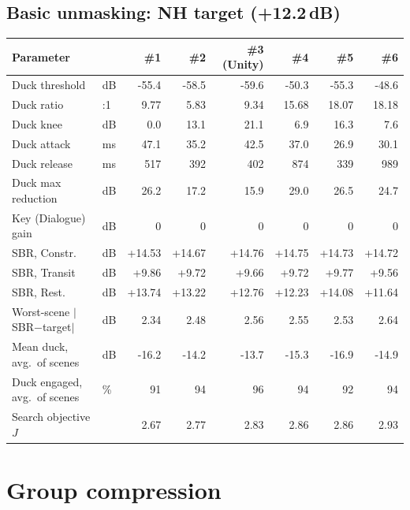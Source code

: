\documentclass[11pt]{article}
\begin{document}
\subsection*{Basic unmasking: NH target (+12.2\,dB)}
\begin{table}[H]\centering\scriptsize
\begin{tabular}{@{}l l rrrrrr@{}}
\toprule
\textbf{Parameter} & & \textbf{\#1} & \textbf{\#2} & \textbf{\#3} \textbf{(Unity)} & \textbf{\#4} & \textbf{\#5} & \textbf{\#6} \\
\midrule
Duck threshold & dB & -55.4 & -58.5 & -59.6 & -50.3 & -55.3 & -48.6 \\
Duck ratio & :1 & 9.77 & 5.83 & 9.34 & 15.68 & 18.07 & 18.18 \\
Duck knee & dB & 0.0 & 13.1 & 21.1 & 6.9 & 16.3 & 7.6 \\
Duck attack & ms & 47.1 & 35.2 & 42.5 & 37.0 & 26.9 & 30.1 \\
Duck release & ms & 517 & 392 & 402 & 874 & 339 & 989 \\
Duck max reduction & dB & 26.2 & 17.2 & 15.9 & 29.0 & 26.5 & 24.7 \\
Key (Dialogue) gain & dB & 0 & 0 & 0 & 0 & 0 & 0 \\
\midrule
SBR, Constr. & dB & +14.53 & +14.67 & +14.76 & +14.75 & +14.73 & +14.72 \\
SBR, Transit & dB & +9.86 & +9.72 & +9.66 & +9.72 & +9.77 & +9.56 \\
SBR, Rest. & dB & +13.74 & +13.22 & +12.76 & +12.23 & +14.08 & +11.64 \\
Worst-scene $|$SBR$-$target$|$ & dB & 2.34 & 2.48 & 2.56 & 2.55 & 2.53 & 2.64 \\
Mean duck, avg.\ of scenes & dB & -16.2 & -14.2 & -13.7 & -15.3 & -16.9 & -14.9 \\
Duck engaged, avg.\ of scenes & \% & 91 & 94 & 96 & 94 & 92 & 94 \\
Search objective $J$ & & 2.67 & 2.77 & 2.83 & 2.86 & 2.86 & 2.93 \\
\bottomrule
\end{tabular}
\end{table}

\clearpage

\section{Group compression}
\end{document}
